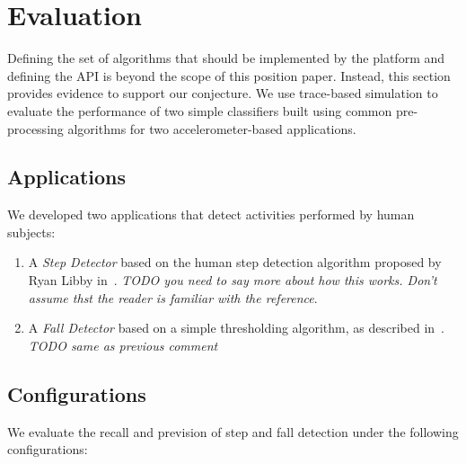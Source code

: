\section{Evaluation}
\label{sec:validation}

Defining the set of algorithms that should be implemented by the
platform and defining the API is beyond the scope of this position
paper.  Instead, this section provides evidence to support our
conjecture.  We use trace-based simulation to evaluate the performance
of two simple classifiers built using common pre-processing algorithms
for two accelerometer-based applications.


\subsection{Applications}

We developed two applications that detect activities performed by 
human subjects:

\begin{enumerate}
\setlength{\itemsep}{-3pt}  

\item A {\em Step Detector} based on the human step detection algorithm
  proposed by Ryan Libby in~\cite{libbyFootstepDetection}. {\em TODO you need to say more about how this works.  Don't assume thst the reader is familiar with the reference}.

\item A {\em Fall Detector} based on a simple thresholding algorithm,
  as described in~\cite{kangasFallDetection}.  {\em TODO same as
    previous comment}

\end{enumerate}

\subsection{Configurations}

We evaluate the recall and prevision of step and fall detection under the following configurations:

